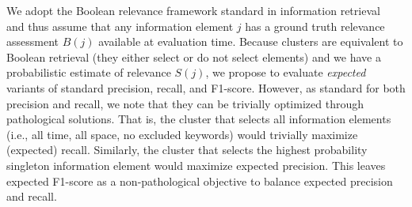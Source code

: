 We adopt the Boolean relevance framework standard in information retrieval~\cite{Baeza-Yates2010} and thus assume that any information element $j$ has a ground truth relevance assessment $B(j)$ available at evaluation time.  
Because clusters are equivalent to Boolean retrieval (they either select or do not select elements) and we have a probabilistic estimate of relevance $S(j)$, we propose to evaluate
\emph{expected} variants of standard precision, recall, and F1-score.
However, as standard for both precision and recall, we note that they can be trivially optimized through pathological solutions.  That is, the cluster that selects all information elements (i.e., all time, all space, no excluded keywords) would trivially maximize (expected) recall.  Similarly, the cluster that selects the highest probability singleton information element would maximize expected precision.  This leaves expected F1-score as a non-pathological objective to balance expected precision and recall. %

